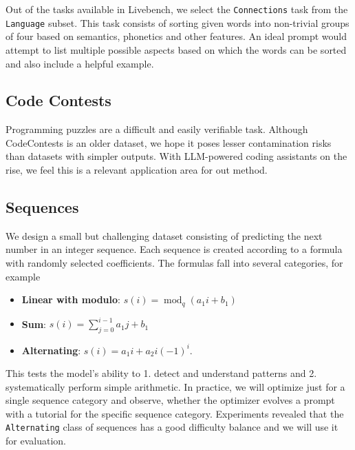 Out of the tasks available in Livebench, we select the \texttt{Connections} task from the \texttt{Language} subset. 
This task consists of sorting given words into non-trivial groups of four based on semantics, phonetics and other features. 
An ideal prompt would attempt to list multiple possible aspects based on which the words can be sorted and also include a helpful example.

\subsection{Code Contests}
Programming puzzles are a difficult and easily verifiable task. Although CodeContests\cite{li2022competition} is an older dataset, 
we hope it poses lesser contamination risks than datasets with simpler outputs. With LLM-powered coding assistants on the rise, we
feel this is a relevant application area for out method. 

\subsection{Sequences}
We design a small but challenging dataset consisting of predicting the next number in an integer sequence.
Each sequence is created according to a formula with randomly selected coefficients. The formulas fall into several categories, for example
\begin{itemize}
    \item \textbf{Linear with modulo}: $s(i) = \operatorname{mod}_{q}(a_{1} i + b_{1})$
    \item \textbf{Sum}: $s(i) = \sum_{j=0}^{i-1}a_{1} j + b_{1}$
    \item \textbf{Alternating}: $s(i) = a_{1}i + a_{2}i(-1)^{i}$.
\end{itemize}
This tests the model's ability to 1. detect and understand patterns and 2. systematically perform simple arithmetic. 
In practice, we will optimize just for a single sequence category and observe, whether the optimizer evolves a prompt with a tutorial for the specific sequence category.
Experiments revealed that the \texttt{Alternating} class of sequences has a good difficulty balance and we will use it for evaluation.

